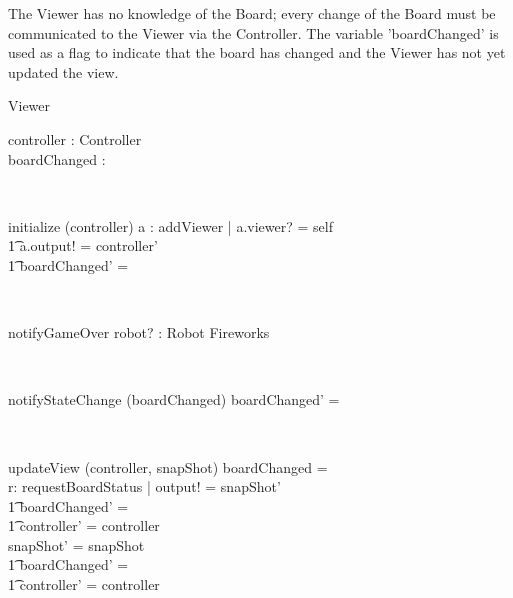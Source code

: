 \documentclass[12pt]{article}
\begin{document}
The Viewer has no knowledge of the Board; every change of the Board must be communicated to the Viewer via the Controller. The variable 'boardChanged' is used as a flag to indicate that the board has changed and the Viewer has not yet updated the view.
\begin{class}{Viewer}
\begin{state}
controller : Controller \\
boardChanged : \bool
\end{state}\\
\begin{schema}{initialize}
\Delta (controller)
\where
\exists a : addViewer | a.viewer? = self \implies \\ \t1
a.output! = controller' \\ \t1
boardChanged' = \false
\end{schema}\\
\begin{schema}{notifyGameOver}
robot? : Robot
\where
Fireworks
\end{schema}\\
\begin{schema}{notifyStateChange}
\Delta (boardChanged)
\where
boardChanged' = \true
\end{schema}\\
\begin{schema}{updateView}
\Delta (controller, snapShot)
\where
\IF boardChanged = \true \\
\THEN \exists r: requestBoardStatus | output! = snapShot' \\ \t1
boardChanged' = \false \\ \t1
controller' = controller \\
\ELSE snapShot' = snapShot \\ \t1
boardChanged' = \false \\ \t1
controller' = controller
\end{schema}
\end{class}
\end{document}
